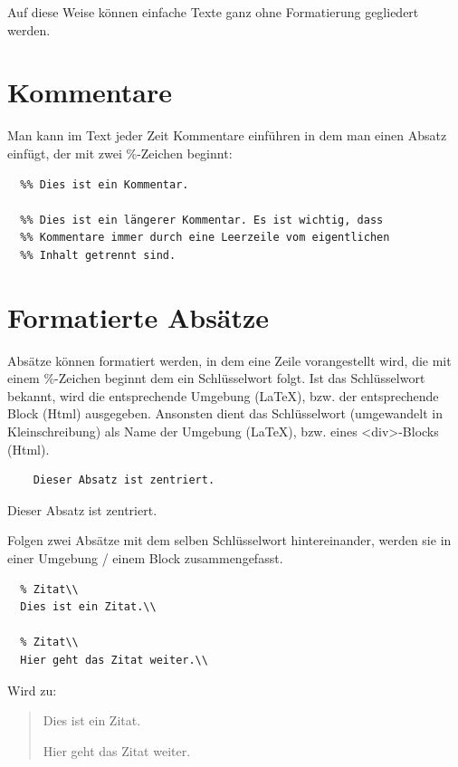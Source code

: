 \documentclass{scrartcl}
\begin{document}
Auf diese Weise können einfache Texte ganz ohne Formatierung
gegliedert werden.

\section{Kommentare}

Man kann im Text jeder Zeit Kommentare einführen in dem man einen Absatz einfügt, der mit zwei \%-Zeichen beginnt:

\begin{verbatim}
  %% Dies ist ein Kommentar.

  %% Dies ist ein längerer Kommentar. Es ist wichtig, dass
  %% Kommentare immer durch eine Leerzeile vom eigentlichen
  %% Inhalt getrennt sind.
\end{verbatim}




\section{Formatierte Absätze}

Absätze können formatiert werden, in dem eine Zeile
vorangestellt wird, die mit einem \%-Zeichen beginnt dem ein
Schlüsselwort folgt. Ist das Schlüsselwort bekannt, wird
die entsprechende Umgebung (LaTeX), bzw. der entsprechende
Block (Html) ausgegeben. Ansonsten dient das Schlüsselwort
(umgewandelt in Kleinschreibung) als Name der Umgebung
(LaTeX), bzw. eines <div>-Blocks (Html).

\begin{verbatim}
	Dieser Absatz ist zentriert.
\end{verbatim}


\begin{center}
Dieser Absatz ist zentriert.
\end{center}


Folgen zwei Absätze mit dem selben Schlüsselwort
hintereinander, werden sie in einer Umgebung / einem Block
zusammengefasst.

\begin{verbatim}
  % Zitat\\
  Dies ist ein Zitat.\\

  % Zitat\\
  Hier geht das Zitat weiter.\\
\end{verbatim}


Wird zu:

\begin{quote}
Dies ist ein Zitat.

Hier geht das Zitat weiter.
\end{quote}
\end{document}
